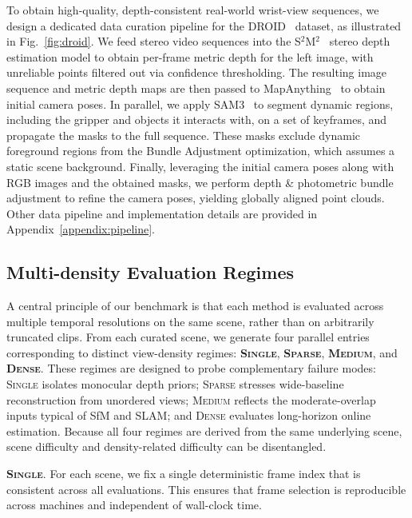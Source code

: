 To obtain high-quality, depth-consistent real-world wrist-view sequences, we design a dedicated data curation pipeline for the DROID~\citep{khazatsky2024droid} dataset, as illustrated in Fig.~\ref{fig:droid}.
%
We feed stereo video sequences into the S$^2$M$^2$~\citep{min2025s2m2} stereo depth estimation model to obtain per-frame metric depth for the left image, with unreliable points filtered out via confidence thresholding.
%
The resulting image sequence and metric depth maps are then passed to MapAnything~\citep{keetha2026mapanything} to obtain initial camera poses.
%
In parallel, we apply SAM3~\citep{carion2025sam3} to segment dynamic regions, including the gripper and objects it interacts with, on a set of keyframes, and propagate the masks to the full sequence. 
%
These masks exclude dynamic foreground regions from the Bundle Adjustment optimization, which assumes a static scene background.
%
Finally, leveraging the initial camera poses along with RGB images and the obtained masks, we perform depth \& photometric bundle adjustment to refine the camera poses, yielding globally aligned point clouds.
%
Other data pipeline and implementation details are provided in Appendix~\ref{appendix:pipeline}.


\subsection{Multi-density Evaluation Regimes}
\label{sec:data:regimes}

A central principle of our benchmark is that each method is evaluated across multiple temporal resolutions on the same scene, rather than on arbitrarily truncated clips. 
%
From each curated scene, we generate four parallel entries corresponding to distinct view-density regimes: \textbf{\textsc{Single}}, \textbf{\textsc{Sparse}}, \textbf{\textsc{Medium}}, and \textbf{\textsc{Dense}}. 
%
These regimes are designed to probe complementary failure modes: \textsc{Single} isolates monocular depth priors; \textsc{Sparse} stresses wide-baseline reconstruction from unordered views; \textsc{Medium} reflects the moderate-overlap inputs typical of SfM and SLAM; and \textsc{Dense} evaluates long-horizon online estimation. 
%
Because all four regimes are derived from the same underlying scene, scene difficulty and density-related difficulty can be disentangled.

\textbf{\textsc{Single}}.
For each scene, we fix a single deterministic frame index that is consistent across all evaluations.
%
This ensures that frame selection is reproducible across machines and independent of wall-clock time.

